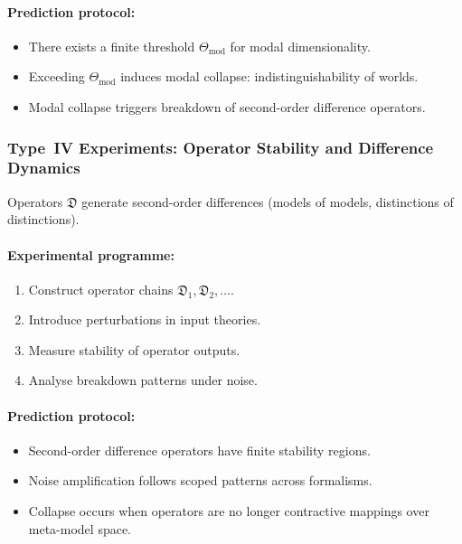 \paragraph{Prediction protocol:}

\begin{itemize}
    \item There exists a finite threshold $\Theta_{\mathrm{mod}}$ for
          modal dimensionality.
    \item Exceeding $\Theta_{\mathrm{mod}}$ induces modal collapse:
          indistinguishability of worlds.
    \item Modal collapse triggers breakdown of
          second-order difference operators.
\end{itemize}



\subsubsection{Type~IV Experiments: Operator Stability and Difference Dynamics}

Operators $\mathfrak{D}$ generate second-order differences
(models of models, distinctions of distinctions).

\paragraph{Experimental programme:}

\begin{enumerate}
    \item Construct operator chains $\mathfrak{D}_1, \mathfrak{D}_2, \dots$.
    \item Introduce perturbations in input theories.
    \item Measure stability of operator outputs.
    \item Analyse breakdown patterns under noise.
\end{enumerate}

\paragraph{Prediction protocol:}

\begin{itemize}
    \item Second-order difference operators have finite stability regions.
    \item Noise amplification follows scoped patterns across formalisms.
    \item Collapse occurs when operators are no longer
          contractive mappings over meta-model space.
\end{itemize}



